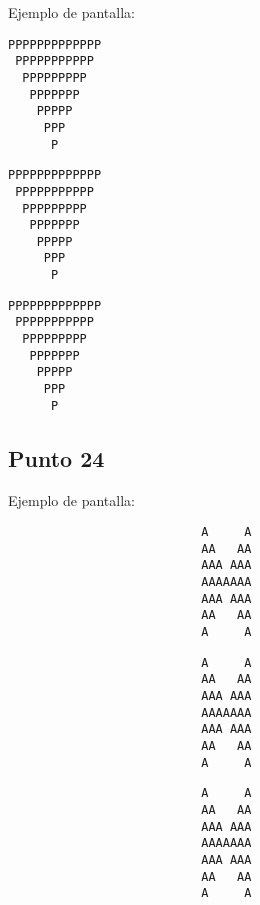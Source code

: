 	Ejemplo de pantalla:
\begin{lstlisting}
PPPPPPPPPPPPP
 PPPPPPPPPPP
  PPPPPPPPP
   PPPPPPP
    PPPPP
     PPP
      P
\end{lstlisting}

\begin{lstlisting}
PPPPPPPPPPPPP
 PPPPPPPPPPP
  PPPPPPPPP
   PPPPPPP
    PPPPP
     PPP
      P
\end{lstlisting}

\begin{lstlisting}
PPPPPPPPPPPPP
 PPPPPPPPPPP
  PPPPPPPPP
   PPPPPPP
    PPPPP
     PPP
      P
\end{lstlisting}





\subsection{Punto 24}
	
	Ejemplo de pantalla:
\begin{lstlisting}
                           A     A
                           AA   AA
                           AAA AAA
                           AAAAAAA
                           AAA AAA
                           AA   AA
                           A     A
\end{lstlisting}

\begin{lstlisting}
                           A     A
                           AA   AA
                           AAA AAA
                           AAAAAAA
                           AAA AAA
                           AA   AA
                           A     A
\end{lstlisting}

\begin{lstlisting}
                           A     A
                           AA   AA
                           AAA AAA
                           AAAAAAA
                           AAA AAA
                           AA   AA
                           A     A
\end{lstlisting}



